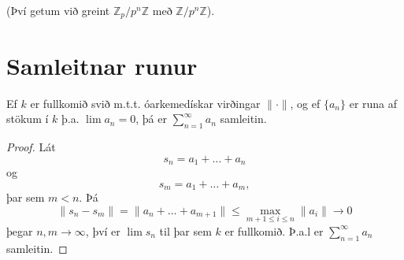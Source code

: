 (Því getum við greint $\mathbb{Z}_p/p^n\mathbb{Z}$ með 
$\mathbb{Z}/p^n\mathbb{Z}$).



\section*{Samleitnar runur}
\begin{setn}
Ef $k$ er fullkomið svið m.t.t. óarkemedískar virðingar $\| \cdot  \|$, og ef $\{ a_n \} $ er 
runa af stökum í $k$ þ.a. $\lim a_n = 0$, þá er $\sum_{n=1}^\infty a_n$ samleitin.
\end{setn}
\begin{proof}
Lát 
\begin{equation*}
s_n = a_1+ \ldots + a_n
\end{equation*}
og
\begin{equation*}
s_m = a_1 + \ldots + a_m,
\end{equation*}
þar sem $m < n$. Þá
\begin{equation*}
\|s_n - s_m \| = \| a_n + \ldots + a_{m+1} \| \leq \max_{m+1 \leq i \leq n} \|a_i\| \rightarrow 0
\end{equation*}
þegar $n,m \rightarrow \infty$, því er $\lim s_n$ til þar sem $k$ er fullkomið. Þ.a.l er $\sum_{n=1}^\infty a_n$ samleitin.
\end{proof}

